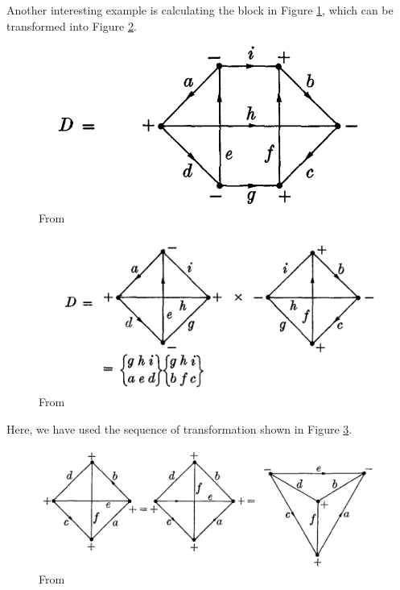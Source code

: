 \documentclass[11pt]{article}
\begin{document}
Another interesting example is calculating the block in Figure \ref{fig:block_ex}, which can be transformed into Figure \ref{fig:block_ex1}.
\begin{figure}[!htb]
	\centering
	\includegraphics[scale=0.7]{blocks_ex1}
	\caption{From \cite{angular_momentum}}
	\label{fig:block_ex}
\end{figure}
\begin{figure}[!htb]
	\centering
	\includegraphics[scale=0.7]{blocks_ex2}
	\caption{From \cite{angular_momentum}}
	\label{fig:block_ex1}
\end{figure}
Here, we have used the sequence of transformation shown in Figure \ref{fig:justify}.
\begin{figure}[!htb]
	\centering
	\includegraphics[scale=0.7]{transformation}
	\caption{From \cite{angular_momentum}}
	\label{fig:justify}
\end{figure}
\end{document}
